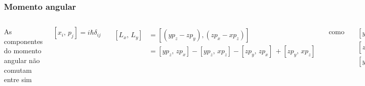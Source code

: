 \documentclass[12pt,brazil,table]{beamer}
\begin{document}
\begin{frame}
  \frametitle{Momento angular}
  \fontsize{7pt}{11pt}\selectfont
  
  \setlength{\abovedisplayskip}{-8pt}
  \setlength{\belowdisplayskip}{2pt}
  \setlength{\abovedisplayshortskip}{-8pt}
  \setlength{\belowdisplayshortskip}{2pt}

  
  \begin{columns}[T]
      As componentes do momento angular não comutam entre sim
      
      \[
       \left[x_i,\,p_j\right] = i\hbar \delta_{ij}
      \]
      
      \begin{align*}
        \left[ L_x,\, L_y\right] &= \left[ \left( yp_z - zp_y \right), \left( zp_x - xp_z \right)  \right]\\
            &=  \left[ yp_z ,\, zp_x  \right] - \left[ yp_z ,\,  xp_z\right] -\left[ zp_y ,\, zp_x \right]\, + \left[ zp_y ,\, xp_z \right]
      \end{align*}
      
      como
      
      \begin{align*}
            \left[ yp_z ,\,  xp_z\right] &= \left[ y ,\,  x\right]p_z=0\\
            \left[ zp_y ,\, zp_x \right] &= z\left[ p_y ,\, p_x \right]=0\\
            \left[ yp_z ,\, zp_x  \right] &= yp_z\, zp_x - zp_x\, yp_z\\
            &= yp_z\, p_xz - zy\,p_xp_z\\
            &= yp_x\, p_zz - yz\,p_xp_z\\
            &= yp_x\, p_zz - yp_x\,zp_z\\
            &= yp_x\left( p_zz - zp_z \right)\\
            &= yp_x\left[ p_z ,\, z \right]\\
            &= -i\hbar yp_x
          \end{align*}
          


      então
      
        \begin{align*}
            \left[ L_x,\, L_y\right] &= i\hbar\left( xp_y -  yp_x\right)\\
            &= iL_z
          \end{align*}
          

\end{columns}
\end{frame}
\end{document}
